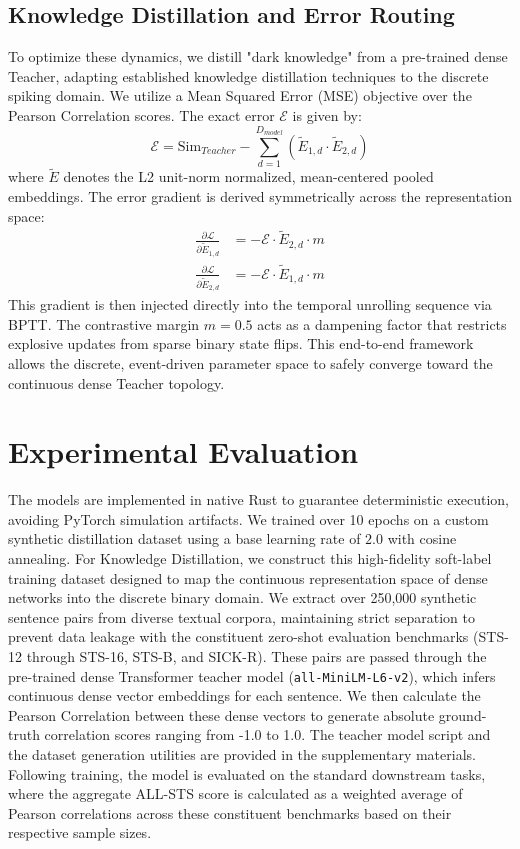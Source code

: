 \documentclass{article} %
\begin{document}
\subsection{Knowledge Distillation and Error Routing}
To optimize these dynamics, we distill "dark knowledge" from a pre-trained dense Teacher, adapting established knowledge distillation techniques \citep{hinton2015distilling} to the discrete spiking domain. We utilize a Mean Squared Error (MSE) objective over the Pearson Correlation scores. The exact error $\mathcal{E}$ is given by:
\begin{equation}
\mathcal{E} = \text{Sim}_{Teacher} - \sum_{d=1}^{D_{model}} \left(\tilde{E}_{1,d} \cdot \tilde{E}_{2,d}\right)
\end{equation}
where $\tilde{E}$ denotes the L2 unit-norm normalized, mean-centered pooled embeddings. The error gradient is derived symmetrically across the representation space:
\begin{align}
\frac{\partial \mathcal{L}}{\partial \tilde{E}_{1,d}} &= -\mathcal{E} \cdot \tilde{E}_{2,d} \cdot m \\
\frac{\partial \mathcal{L}}{\partial \tilde{E}_{2,d}} &= -\mathcal{E} \cdot \tilde{E}_{1,d} \cdot m
\end{align}
This gradient is then injected directly into the temporal unrolling sequence via BPTT. The contrastive margin $m=0.5$ acts as a dampening factor that restricts explosive updates from sparse binary state flips. This end-to-end framework allows the discrete, event-driven parameter space to safely converge toward the continuous dense Teacher topology.

\section{Experimental Evaluation}

The models are implemented in native Rust to guarantee deterministic execution, avoiding PyTorch simulation artifacts. We trained over 10 epochs on a custom synthetic distillation dataset using a base learning rate of $2.0$ with cosine annealing. For Knowledge Distillation, we construct this high-fidelity soft-label training dataset designed to map the continuous representation space of dense networks into the discrete binary domain. We extract over 250,000 synthetic sentence pairs from diverse textual corpora, maintaining strict separation to prevent data leakage with the constituent zero-shot evaluation benchmarks (STS-12 through STS-16, STS-B, and SICK-R). These pairs are passed through the pre-trained dense Transformer teacher model (\texttt{all-MiniLM-L6-v2}), which infers continuous dense vector embeddings for each sentence. We then calculate the Pearson Correlation between these dense vectors to generate absolute ground-truth correlation scores ranging from -1.0 to 1.0. The teacher model script and the dataset generation utilities are provided in the supplementary materials. Following training, the model is evaluated on the standard downstream tasks, where the aggregate ALL-STS score is calculated as a weighted average of Pearson correlations across these constituent benchmarks based on their respective sample sizes.
\end{document}
